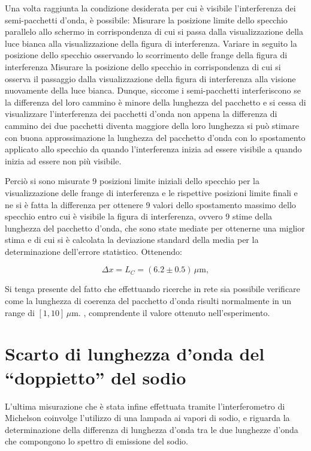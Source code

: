 \documentclass[a4paper,12pt]{article}
\begin{document}
Una volta raggiunta la condizione desiderata per cui è visibile l’interferenza dei semi-pacchetti d’onda, è possibile: 
Misurare la posizione limite dello specchio parallelo allo schermo in corrispondenza di cui si passa dalla visualizzazione della luce bianca alla visualizzazione della figura di interferenza. 
Variare in seguito la posizione dello specchio osservando lo scorrimento delle frange della figura di interferenza 
Misurare la posizione dello specchio in corrispondenza di cui si osserva il passaggio dalla visualizzazione della figura di interferenza alla visione nuovamente della luce bianca. 
Dunque, siccome i semi-pacchetti interferiscono se la differenza del loro cammino è minore della lunghezza del pacchetto e si cessa di visualizzare l’interferenza dei pacchetti d’onda non appena la differenza di cammino dei due pacchetti diventa maggiore della loro lunghezza si può stimare con buona approssimazione la lunghezza del pacchetto d’onda con lo spostamento applicato allo specchio da quando l’interferenza inizia ad essere visibile a quando inizia ad essere non più visibile. 

Perciò si sono misurate 9 posizioni limite iniziali dello specchio per la visualizzazione delle frange di interferenza e le rispettive posizioni limite finali e ne si è fatta la differenza per ottenere 9 valori dello spostamento massimo dello specchio entro cui è visibile la figura di interferenza, ovvero 9 stime della lunghezza del pacchetto d’onda, che sono state mediate per ottenerne una miglior stima e di cui si è calcolata la deviazione standard della media per la determinazione dell’errore statistico. 
Ottenendo: 

\begin{equation}
\Delta x = L_C = (6.2 \pm 0.5) \, \mu\text{m},
\label{eq:lunghezza_coerenza}
\end{equation}

Si tenga presente del fatto che effettuando ricerche in rete sia possibile verificare come la lunghezza di coerenza del pacchetto d’onda risulti normalmente in un range di 
\([1, 10] \, \mu\text{m}.\) , comprendente il valore ottenuto nell’esperimento. 
 
\section{Scarto di lunghezza d’onda del “doppietto” del sodio}

L’ultima misurazione che è stata infine effettuata tramite l’interferometro di Michelson coinvolge l’utilizzo di una lampada ai vapori di sodio, e riguarda la determinazione della differenza di lunghezza d’onda tra le due lunghezze d’onda che compongono lo spettro di emissione del sodio.
\end{document}
